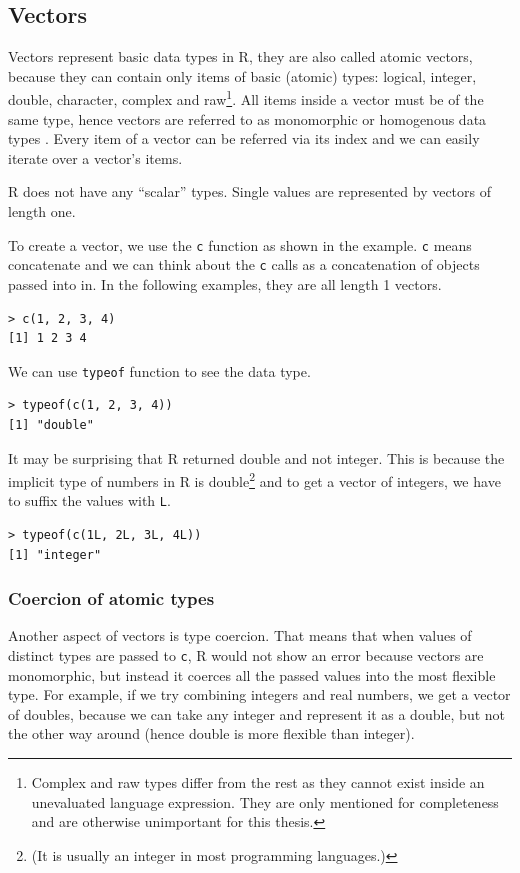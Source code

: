 \documentclass[thesis=B,english]{FITthesis}[2012/10/20]
\begin{document}
\subsection{Vectors}
Vectors represent basic data types in R, they are also called atomic vectors, because they can contain only items of basic (atomic) types: logical, integer, double, character, complex and raw\footnote{Complex and raw types differ from the rest as they cannot exist inside an unevaluated language expression. They are only mentioned for completeness and are otherwise unimportant for this thesis.}. All items inside a vector must be of the same type, hence vectors are referred to as monomorphic or homogenous data types \cite{advR}. Every item of a vector can be referred via its index and we can easily iterate over a vector’s items.

R does not have any “scalar” types. Single values are represented by vectors of length one.

To create a vector, we use the \verb|c| function as shown in the example. \verb|c| means concatenate and we can think about the \verb|c| calls as a concatenation of objects passed into in. In the following examples, they are all length 1 vectors.

\begin{verbatim}
> c(1, 2, 3, 4)
[1] 1 2 3 4
\end{verbatim}

We can use \verb|typeof| function to see the data type.

\begin{verbatim}
> typeof(c(1, 2, 3, 4))
[1] "double"
\end{verbatim}

It may be surprising that R returned double and not integer. This is because the implicit type of numbers in R is double\footnote{(It is usually an integer in most programming languages.)} and to get a vector of integers, we have to suffix the values with \verb|L|.

\begin{verbatim}
> typeof(c(1L, 2L, 3L, 4L))
[1] "integer"
\end{verbatim}

\subsubsection{Coercion of atomic types}
Another aspect of vectors is type coercion. That means that when values of distinct types are passed to \verb|c|, R would not show an error because vectors are monomorphic, but instead it coerces all the passed values into the most flexible type. For example, if we try combining integers and real numbers, we get a vector of doubles, because we can take any integer and represent it as a double, but not the other way around (hence double is more flexible than integer).
\end{document}
